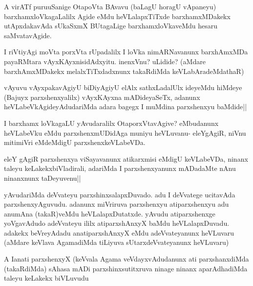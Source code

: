 \begin{artha}
A virATf puruuSanige OtapoVta BAvavu (baLagU horagU vApaneyu) barxhamxloVkagaLalilx Agide eMdu heVLalapxTiTxde barxhamxMDakekx utApxdakavAda sUkaSxmX BUtagaLige barxhamxloVkaveMdu hesaru saMvatavAgide.
\end{artha}

\begin{artha}
I riVtiyAgi moVta porxVta rUpadalilx I loVka nimARNavanunx barxhAmxMDa payaRMtara vAyxKAyxnisidAdxyitu. inenxVnu? uLidide? (aMdare barxhAmxMDakekx melalxTiTxdadxnunx takaRdiMda keVLabAradeMdathaR)
\end{artha}


\begin{artha}
vAyuvu vAyxpakavAgiyU biDiyAgiyU elAlx sathxLadalUlx ideyeMdu hiMdeye (Bajuyx parxshenxyalilx) vAyxKAyxna mADideyaSeTx, adanunx heVLabeVkAgideyAdudariMda adara bagegx I muMdina parxshenxyu baMdide||
\end{artha}

\begin{artha}
I barxhamx loVkagaLU yAvudaralilx OtaporxVtavAgive? eMbudanunx heVLabeVku eMdu parxshenxmUDidAga muniyu heVLuvanu- eleYgAgiR, niVnu mitimiVri eMdeMdigU parxshenxkeVLabeVDa.
\end{artha}


\begin{artha}
eleY gAgiR parxshenxya viSayavanunx atikarxmisi eMdigU keVLabeVDa, ninanx taleyu keLakekxbiVladirali, adariMda I parxshenxyanunx mADadaMte nAnu ninanxnunx taDeyuvenu||
\end{artha}


\begin{artha}
yAvudariMda deVvateyu parxshinxsalapxDuvado. adu I deVvatege ucitavAda parxshenxyAguvudu. adanunx miVriruva parxshenxyu atiparxshenxyu adu anumAna (takaR)veMdu heVLalapxDutatxde. yAvudu atiparxshenxge yoVgavAdudo adeVvateyu ililx atiparxshAnxyX baMdu heVLalapxDuvadu. adakekx beVreyAdadu anatiparxshAnxyX eMdu adeVvateyanunx heVLuvaru (aMdare keVlava AgamadiMda tiLiyuva sUtarxdeVvateyanunx heVLuvaru)
\end{artha}%

\begin{artha}
A Ianati parxshenxyX (keVvala Agama veVdayxvAdudanunx ati parxshanxdiMda (takaRdiMda) sAhasa mADi parxshinxsutitxruva ninage ninanx aparAdhadiMda taleyu keLakekx biVLuvudu 
\end{artha}

